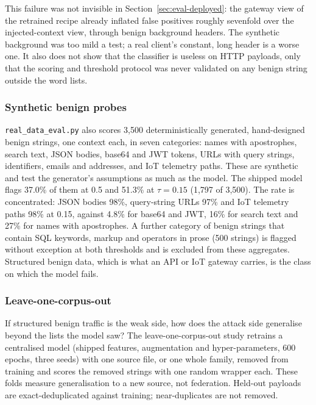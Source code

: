 This failure was not invisible in Section~\ref{sec:eval-deployed}: the gateway view of the retrained recipe already inflated false positives roughly sevenfold over the injected-context view, through benign background headers. The synthetic background was too mild a test; a real client's constant, long header is a worse one. It also does not show that the classifier is useless on HTTP payloads, only that the scoring and threshold protocol was never validated on any benign string outside the word lists.

\subsubsection*{Synthetic benign probes}

\texttt{real\_data\_eval.py} also scores 3{,}500 deterministically generated, hand-designed benign strings, one context each, in seven categories: names with apostrophes, search text, JSON bodies, base64 and JWT tokens, URLs with query strings, identifiers, emails and addresses, and IoT telemetry paths. These are synthetic and test the generator's assumptions as much as the model. The shipped model flags 37.0\% of them at 0.5 and 51.3\% at $\tau=0.15$ (1{,}797 of 3{,}500). The rate is concentrated: JSON bodies 98\%, query-string URLs 97\% and IoT telemetry paths 98\% at 0.15, against 4.8\% for base64 and JWT, 16\% for search text and 27\% for names with apostrophes. A further category of benign strings that contain SQL keywords, markup and operators in prose (500 strings) is flagged without exception at both thresholds and is excluded from these aggregates. Structured benign data, which is what an API or IoT gateway carries, is the class on which the model fails.

\subsubsection*{Leave-one-corpus-out}

If structured benign traffic is the weak side, how does the attack side generalise beyond the lists the model saw? The leave-one-corpus-out study retrains a centralised model (shipped features, augmentation and hyper-parameters, 600 epochs, three seeds) with one source file, or one whole family, removed from training and scores the removed strings with one random wrapper each. These folds measure generalisation to a new source, not federation. Held-out payloads are exact-deduplicated against training; near-duplicates are not removed.

